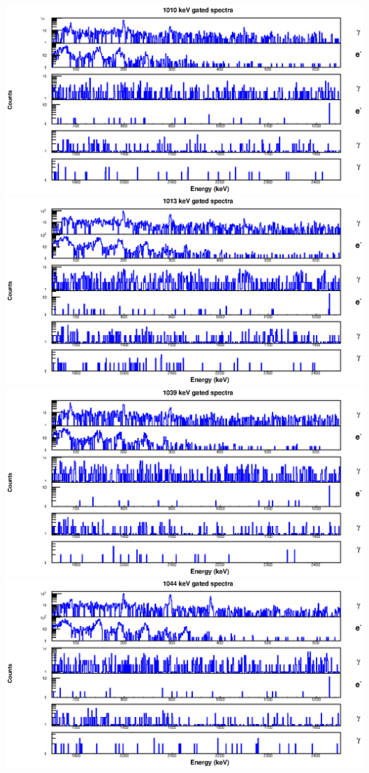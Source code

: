 \begin{landscape}
\includegraphics[scale=1.2]{156Gd_Appendix/1010_combined.eps}
\includegraphics[scale=1.2]{156Gd_Appendix/1013_combined.eps}
\includegraphics[scale=1.2]{156Gd_Appendix/1039_combined.eps}
\includegraphics[scale=1.2]{156Gd_Appendix/1044_combined.eps}

\end{landscape}
